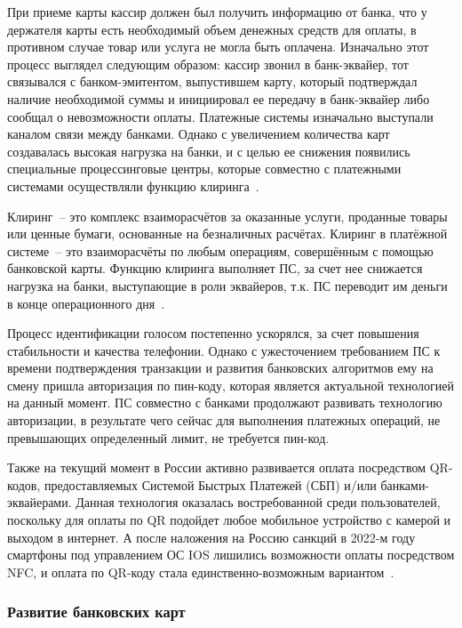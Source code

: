 При приеме карты кассир должен был получить информацию от банка, что у держателя карты есть необходимый объем денежных средств для оплаты, в противном случае товар или услуга не могла быть оплачена.
Изначально этот процесс выглядел следующим образом: кассир звонил в банк-эквайер, тот связывался с банком-эмитентом, выпустившем карту, который подтверждал наличие необходимой суммы и инициировал ее передачу в банк-эквайер либо сообщал о невозможности оплаты.
Платежные системы изначально выступали каналом связи между банками.
Однако с увеличением количества карт создавалась высокая нагрузка на банки, и с целью ее снижения появились специальные процессинговые центры, которые совместно с платежными системами осуществляли функцию клиринга~\cite{habr_fondy_payment_history}.

Клиринг~-- это комплекс взаиморасчётов за оказанные услуги, проданные товары или ценные бумаги, основанные на безналичных расчётах.
Клиринг в платёжной системе~-- это взаиморасчёты по любым операциям, совершённым с помощью банковской карты.
Функцию клиринга выполняет ПС, за счет нее снижается нагрузка на банки, выступающие в роли эквайеров, т.к. ПС переводит им деньги в конце операционного дня~\cite{habr_nspk_cliring}.

Процесс идентификации голосом постепенно ускорялся, за счет повышения стабильности и качества телефонии.
Однако с ужесточением требованием ПС к времени подтверждения транзакции и развития банковских алгоритмов ему на смену пришла авторизация по пин-коду, которая является актуальной технологией на данный момент.
ПС совместно с банками продолжают развивать технологию авторизации, в результате чего сейчас для выполнения платежных операций, не превышающих определенный лимит, не требуется пин-код.

Также на текущий момент в России активно развивается оплата посредством QR-кодов, предоставляемых Системой Быстрых Платежей (СБП) и/или банками-эквайерами.
Данная технология оказалась востребованной среди пользователей, поскольку для оплаты по QR подойдет любое мобильное устройство с камерой и выходом в интернет.
А после наложения на Россию санкций в 2022-м году смартфоны под управлением ОС IOS лишились возможности оплаты посредством NFC, и оплата по QR-коду стала единственно-возможным вариантом~\cite{habr_nspk_qr}.


\subsubsection{Развитие банковских карт}

